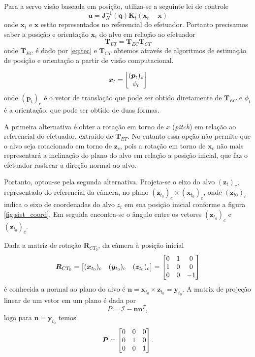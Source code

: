 Para a servo visão baseada em posição, utiliza-se a seguinte lei de controle
\begin{equation} \label{eq:lei_posicao}
\bm{u} = \bm{J}_N^{-1}(\bm{q})  \bm{K}_t (\bm{x}_t - \bm{x})
\end{equation}
onde $\bm{x}_t$ e $\bm{x}$ estão representados no referencial do efetuador. Portanto precisamos saber a posição e orientação $\bm{x}_t$ do alvo em relação ao efetuador
\begin{equation}
\bm{T}_{ET} = \bm{T}_{EC} \bm{T}_{CT}
\end{equation}
onde $\bm{T}_{EC}$ é dado por \eqref{eq:tec} e $\bm{T}_{CT}$ obtemos através de algoritmos de estimação de posição e orientação a partir de visão computacional. 

\begin{equation}
\bm{x}_t = \begin{bmatrix} (\bm{p}_t)_e \\ \phi_t \end{bmatrix}
\end{equation}
onde $(\bm{p}_t)_e$ é o vetor de translação que pode ser obtido diretamente de $\bm{T}_{EC}$ e  $\phi_t$ é a orientação, que pode ser obtido de duas formas.

A primeira alternativa é obter a rotação em torno de $x$ (\textit{pitch}) em relação ao referencial do efetuador, extraído de $\bm{T}_{ET}$. No entanto essa opção não permite que o alvo seja rotacionado em torno de $\bm{z}_c$, pois a rotação em torno de $\bm{x}_c$ não mais representará a inclinação do plano do alvo em relação a posição inicial, que faz o efetuador rastrear a direção normal ao alvo.

Portanto, optou-se pela segunda alternativa. Projeta-se o eixo do alvo $(\bm{z}_t)_c$, representado do referencial da câmera, no plano $(\bm{z}_{t_0})_c \times (\bm{x}_{t_0})_c$, onde $(\bm{z}_{t0})_c$ indica o eixo de coordenadas do alvo $z_t$ em sua posição inicial conforme a figura \ref{fig:sist_coord}. Em seguida encontra-se o ângulo entre os vetores $(\bm{z}_{t_0})_c$ e $(\bm{z}_{t_0})_c$. 

Dada a matriz de rotação $\bm{R}_{CT_0}$, da câmera à posição inicial
\begin{equation}
\bm{R}_{CT_0} = \begin{bmatrix} (\bm{x}_{t_0})_c & (\bm{y}_{t_0})_c  & (\bm{z}_{t_0})_c\end{bmatrix} = 
\begin{bmatrix}
	0 & 1 & 0 \\
	1 & 0 & 0 \\
	0 & 0 & -1
\end{bmatrix}
\end{equation}
é conhecida a normal ao plano do alvo é $\bm{n} = \bm{x}_{t_0} \times \bm{z}_{t_0} =  \bm{y}_{t_0} $. A matrix de projeção linear \cite{strang} de um vetor em um plano é dada por
\begin{equation}
P = \mathcal{I} - \bm{n} \bm{n}^T,
\end{equation}
logo para $\bm{n} = \bm{y}_{t_0}$ temos 
\begin{equation}
\bm{P} =  \begin{bmatrix}
	 0  &   0  &   0 \\
     0  &   1  &   0 \\
     0  &   0  &   1
\end{bmatrix}.
\end{equation}

